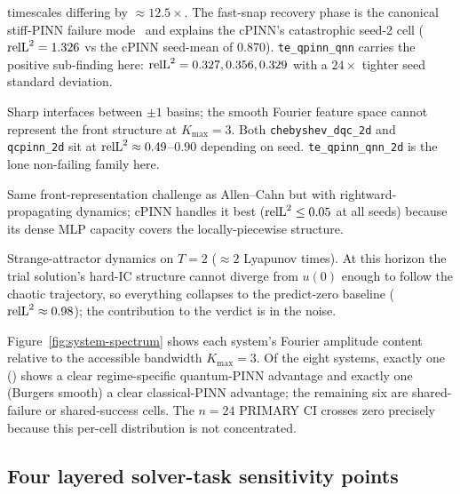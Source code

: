 \begin{description}
        timescales differing by $\approx 12.5\times$. The fast-snap
        recovery phase is the canonical stiff-PINN failure
        mode~\cite{krishnapriyan2021characterizing,wang2022whenwhy}
        and explains the cPINN's catastrophic seed-2 cell
        ($\mathrm{relL}^2 = 1.326$ vs the cPINN seed-mean of 0.870).
        \texttt{te\_qpinn\_qnn} carries the positive sub-finding
        here: $\mathrm{relL}^2 = 0.327, 0.356, 0.329$ with a $24\times$
        tighter seed standard deviation.
  \item[Allen--Cahn (B, double-well front).] Sharp interfaces
        between $\pm 1$ basins; the smooth Fourier feature space
        cannot represent the front structure at $K_{\max} = 3$.
        Both \texttt{chebyshev\_dqc\_2d} and \texttt{qcpinn\_2d}
        sit at $\mathrm{relL}^2 \approx 0.49$--$0.90$ depending on seed.
        \texttt{te\_qpinn\_qnn\_2d} is the lone non-failing
        family here.
  \item[Burgers shock (B, hyperbolic with steep gradient).] Same
        front-representation challenge as Allen--Cahn but with
        rightward-propagating dynamics; cPINN handles it best
        ($\mathrm{relL}^2 \le 0.05$ at all seeds) because its dense MLP
        capacity covers the locally-piecewise structure.
  \item[Lorenz (B, chaotic).] Strange-attractor dynamics on
        $T = 2$ ($\approx 2$ Lyapunov times). At this horizon the
        trial solution's hard-IC structure cannot diverge from
        $u(0)$ enough to follow the chaotic trajectory, so everything
        collapses to the predict-zero baseline
        ($\mathrm{relL}^2 \approx 0.98$); the contribution to the verdict is
        in the noise.
\end{description}

Figure~\ref{fig:system-spectrum} shows each system's Fourier amplitude
content relative to the accessible bandwidth $K_{\max} = 3$. Of the
eight systems, exactly one (\fhn{}) shows a clear regime-specific
quantum-PINN advantage and exactly one (Burgers smooth) a clear
classical-PINN advantage; the remaining six are shared-failure or
shared-success cells. The $n=24$ PRIMARY CI crosses zero precisely
because this per-cell distribution is not concentrated.

\subsection{Four layered solver-task sensitivity points}
\label{sec:solver-verdicts}

